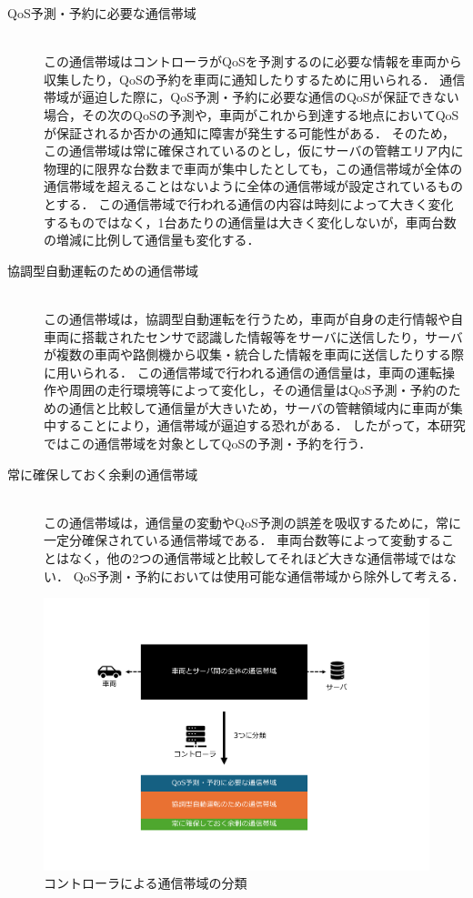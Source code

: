 \documentclass[a4paper,11pt,uplatex]{ujreport}
\begin{document}
\begin{description}
  \item[QoS予測・予約に必要な通信帯域]\mbox{}\\
    この通信帯域はコントローラがQoSを予測するのに必要な情報を車両から収集したり，QoSの予約を車両に通知したりするために用いられる．
    通信帯域が逼迫した際に，QoS予測・予約に必要な通信のQoSが保証できない場合，その次のQoSの予測や，車両がこれから到達する地点においてQoSが保証されるか否かの通知に障害が発生する可能性がある．
    そのため，この通信帯域は常に確保されているのとし，仮にサーバの管轄エリア内に物理的に限界な台数まで車両が集中したとしても，この通信帯域が全体の通信帯域を超えることはないように全体の通信帯域が設定されているものとする．
    この通信帯域で行われる通信の内容は時刻によって大きく変化するものではなく，1台あたりの通信量は大きく変化しないが，車両台数の増減に比例して通信量も変化する．
  \item [協調型自動運転のための通信帯域]\mbox{}\\
    この通信帯域は，協調型自動運転を行うため，車両が自身の走行情報や自車両に搭載されたセンサで認識した情報等をサーバに送信したり，サーバが複数の車両や路側機から収集・統合した情報を車両に送信したりする際に用いられる．
    この通信帯域で行われる通信の通信量は，車両の運転操作や周囲の走行環境等によって変化し，その通信量はQoS予測・予約のための通信と比較して通信量が大きいため，サーバの管轄領域内に車両が集中することにより，通信帯域が逼迫する恐れがある．
    したがって，本研究ではこの通信帯域を対象としてQoSの予測・予約を行う．
  \item [常に確保しておく余剰の通信帯域]\mbox{}\\
    この通信帯域は，通信量の変動やQoS予測の誤差を吸収するために，常に一定分確保されている通信帯域である．
    車両台数等によって変動することはなく，他の2つの通信帯域と比較してそれほど大きな通信帯域ではない．
    QoS予測・予約においては使用可能な通信帯域から除外して考える．
\end{description}

  \begin{figure}[tb]
    \centering
    \includegraphics[width=\linewidth]{img/コントローラによる通信帯域の分類2.pdf}
    \caption{コントローラによる通信帯域の分類}
    \label{fig:bandwidth}
  \end{figure}
\end{document}
